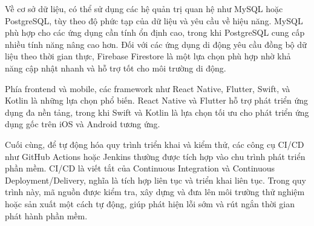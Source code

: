         \hspace*{0.8cm}Về cơ sở dữ liệu, có thể sử dụng các hệ quản trị quan hệ như MySQL hoặc PostgreSQL, tùy theo độ phức tạp của dữ liệu và yêu cầu về hiệu năng. MySQL phù hợp cho các ứng dụng cần tính ổn định cao, trong khi PostgreSQL cung cấp nhiều tính năng nâng cao hơn. Đối với các ứng dụng di động yêu cầu đồng bộ dữ liệu theo thời gian thực, Firebase Firestore là một lựa chọn phù hợp nhờ khả năng cập nhật nhanh và hỗ trợ tốt cho môi trường di động.
      
        \vspace{0.5em}
      
        \hspace*{0.8cm}Phía frontend và mobile, các framework như React Native, Flutter, Swift, và Kotlin là những lựa chọn phổ biến. React Native và Flutter hỗ trợ phát triển ứng dụng đa nền tảng, trong khi Swift và Kotlin là lựa chọn tối ưu cho phát triển ứng dụng gốc trên iOS và Android tương ứng.
      
        \vspace{0.5em}
      
        \hspace*{0.8cm}Cuối cùng, để tự động hóa quy trình triển khai và kiểm thử, các công cụ CI/CD như GitHub Actions hoặc Jenkins thường được tích hợp vào chu trình phát triển phần mềm. CI/CD là viết tắt của Continuous Integration và Continuous Deployment/Delivery, nghĩa là tích hợp liên tục và triển khai liên tục. Trong quy trình này, mã nguồn được kiểm tra, xây dựng và đưa lên môi trường thử nghiệm hoặc sản xuất một cách tự động, giúp phát hiện lỗi sớm và rút ngắn thời gian phát hành phần mềm.
      
   